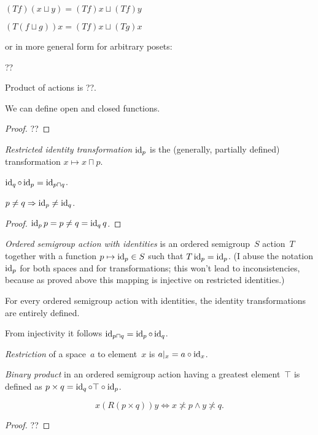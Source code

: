 $(Tf)(x\sqcup y)=(Tf)x\sqcup(Tf)y$

$(T(f\sqcup g))x=(Tf)x\sqcup(Tg)x$

or in more general form for arbitrary posets:

??

Product of actions is ??.

We can define open and closed functions.

\begin{proof}
??
\end{proof}

\emph{Restricted identity transformation} $\operatorname{id}_p$ is the (generally, partially defined) transformation $x\mapsto x\sqcap p$.

\begin{obvious}
$\operatorname{id}_q\circ\operatorname{id}_p = \operatorname{id}_{p\sqcap q}$.
\end{obvious}

\begin{prop}
$p\ne q\Rightarrow\operatorname{id}_p\ne\operatorname{id}_q$.
\end{prop}

\begin{proof}
$\operatorname{id}_p p=p \ne q = \operatorname{id}_q q$.
\end{proof}

\emph{Ordered semigroup action with identities} is an ordered semigroup~$S$ action~$T$ together with a function $p\mapsto\operatorname{id}_p\in S$ such that $T\operatorname{id}_p=\operatorname{id}_p$. (I abuse the notation $\operatorname{id}_p$ for both spaces and for transformations; this won't lead to inconsistencies, because as proved above this mapping is injective on restricted identities.)

\begin{obvious}
For every ordered semigroup action with identities, the identity transformations are entirely defined.
\end{obvious}

From injectivity it follows $\operatorname{id}_{p\sqcap q} = \operatorname{id}_p\circ\operatorname{id}_q$.

\emph{Restriction} of a space~$a$ to element~$x$ is $a|_x=a\circ\operatorname{id}_x$.

\emph{Binary product} in an ordered semigroup action having a greatest element~$\top$ is defined as $p\times q=\operatorname{id}_q\circ\top\circ\operatorname{id}_p$.

\begin{thm}
\[ x(R(p\times q))y\Leftrightarrow x\nasymp p\land y\nasymp q. \]
\end{thm}

\begin{proof}
??
\end{proof}

